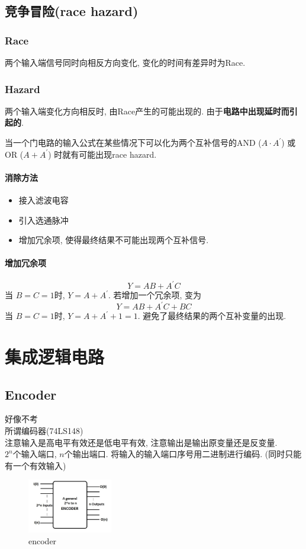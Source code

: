 \documentclass[scheme=chinese,a4paper]{report}
\begin{document}
\section{竞争冒险(race hazard)}
\subsection{Race}
两个输入端信号同时向相反方向变化, 变化的时间有差异时为Race. 
\subsection{Hazard}
两个输入端变化方向相反时, 由Race产生的可能出现的. 由于\textbf{电路中出现延时而引起的}. \par
当一个门电路的输入公式在某些情况下可以化为两个互补信号的AND ($ A\cdot A ^\prime $) 或OR ($ A+A ^\prime $) 时就有可能出现race hazard. 
\subsubsection{消除方法}
\begin{itemize}
    \item 接入滤波电容
    \item 引入选通脉冲
    \item 增加冗余项, 使得最终结果不可能出现两个互补信号. 
\end{itemize}
\subsubsection{增加冗余项}
\label{eg:hazard}
$$ Y=AB+A ^\prime C $$ 当 $ B=C=1 $时, $ Y=A+A ^\prime $. 
若增加一个冗余项, 变为 $$ Y=AB+A ^\prime C+BC $$
当 $ B=C=1 $时, $ Y=A+A ^\prime+1=1 $. 避免了最终结果的两个互补变量的出现. 
\chapter{集成逻辑电路}
\section{Encoder}
好像不考\\
所谓编码器(74LS148)\\
注意输入是高电平有效还是低电平有效, 注意输出是输出原变量还是反变量. \\
$2^n$个输入端口, $n$个输出端口. 将输入的输入端口序号用二进制进行编码. (同时只能有一个有效输入)
\begin{figure}[H]
    \centering
    \includegraphics[width=0.33\textwidth]{Encoder_block_diagram.jpg}
    \caption{encoder}
\end{figure}
\end{document}
